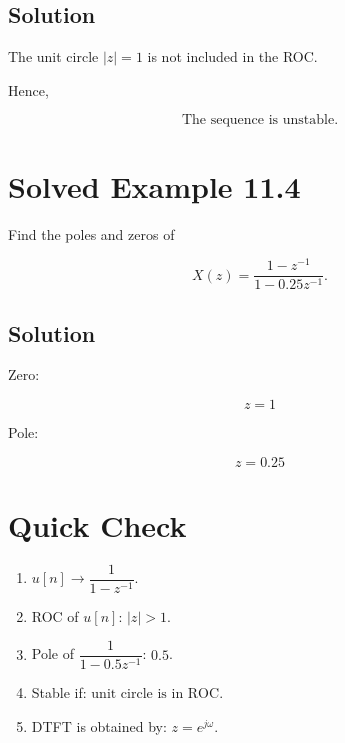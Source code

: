 \subsection{Solution}

The unit circle \(|z|=1\) is not included in the ROC.

Hence,

\[
\boxed{
\text{The sequence is unstable.}
}
\]


\section{Solved Example 11.4}

Find the poles and zeros of

\[
X(z)=
\frac{1-z^{-1}}
{1-0.25z^{-1}}.
\]


\subsection{Solution}

Zero:

\[
\boxed{
z=1
}
\]

Pole:

\[
\boxed{
z=0.25
}
\]


\section{Quick Check}

\begin{enumerate}
\item \(u[n]\rightarrow \boxed{\dfrac{1}{1-z^{-1}}}\).
\item ROC of \(u[n]\): \(\boxed{|z|>1}\).
\item Pole of \(\dfrac{1}{1-0.5z^{-1}}\): \(\boxed{0.5}\).
\item Stable if: \(\boxed{\text{unit circle is in ROC}}\).
\item DTFT is obtained by: \(\boxed{z=e^{j\omega}}\).
\end{enumerate}


